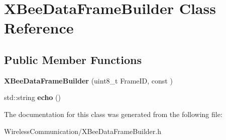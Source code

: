 \hypertarget{class_x_bee_data_frame_builder}{}\section{X\+Bee\+Data\+Frame\+Builder Class Reference}
\label{class_x_bee_data_frame_builder}
\subsection*{Public Member Functions}
\begin{DoxyCompactItemize}
\item 
\hypertarget{class_x_bee_data_frame_builder_a9c3c3884db0f74105ab1eb5d7c7c08c0}{}{\bfseries X\+Bee\+Data\+Frame\+Builder} (uint8\+\_\+t Frame\+I\+D, const )\label{class_x_bee_data_frame_builder_a9c3c3884db0f74105ab1eb5d7c7c08c0}

\item 
\hypertarget{class_x_bee_data_frame_builder_a5ce63bcc02b7d8dfc00f82251714f7b0}{}std\+::string {\bfseries echo} ()\label{class_x_bee_data_frame_builder_a5ce63bcc02b7d8dfc00f82251714f7b0}

\end{DoxyCompactItemize}


The documentation for this class was generated from the following file\+:\begin{DoxyCompactItemize}
\item 
Wireless\+Communication/X\+Bee\+Data\+Frame\+Builder.\+h\end{DoxyCompactItemize}
